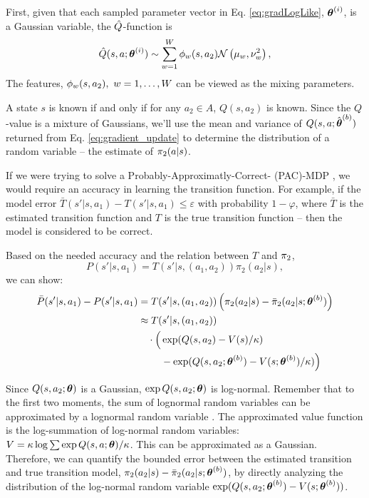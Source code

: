     First, given that each sampled parameter vector in Eq. \ref{eq:gradLogLike}, $\boldsymbol{\mathbb{\theta}}^{(i)}$, is a Gaussian
    variable, the $\hat{Q}$-function is
    \[
        \hat{Q}(s,a ;\boldsymbol{\mathbb{\theta}}^{(i)}) \sim \sum_{w=1}^W \phi_{w}(s,a_2) \mathcal{N}\left(\mu_w, \nu_w^2\right),
    \]
    The features, $\phi_{w}(s,a_2),\ w=1,\ldots, W$ can be viewed as the mixing parameters.

    A state $s$ is known if and only if for any $a_2 \in A$, $Q(s,a_2)$ is known. Since the $Q$-value is a mixture of
    Gaussians, we'll use the mean and variance of $Q(s,a;\hat{\boldsymbol{\mathbb{\theta}}}^{(b)})$ returned from Eq.
    \ref{eq:gradient_update} to determine the distribution of a random variable -- the estimate of $\pi_{2}(a|s)$.

    If we were trying to solve a Probably-Approximatly-Correct- (PAC)-MDP \cite{Fu-RSS-14}, we would require an accuracy
    in learning the transition function. For example, if the model error $\bar T(s'|s,a_1) - T(s'|s,a_1) \le
    \varepsilon$ with probability $1-\varphi$, where $\bar T$ is the estimated transition function and $T$ is the true
    transition function -- then the model is considered to be correct.

    Based on the needed accuracy and the relation between $T$ and $\pi_{2}$,
    \[
        P(s'|s,a_1) = T(s'|s,(a_1,a_2))\pi_2(a_2|s),
    \]
    we can show:
    \begin{align*}
        \bar P(s'|s,a_1)  -P(s'|s,a_1)
        & = T(s'|s,(a_1,a_2))\left( \pi_2(a_2|s) - \bar \pi_2(a_2|s;\boldsymbol{\mathbb{\theta}}^{(b)})
        \right)\\
        & \approx T(s'|s,(a_1,a_2)) \\
        & \quad \cdot \Big(\exp(Q(s,a_2)-V(s)/\kappa) \\
        & \qquad\ - \exp(Q(s,a_2;\boldsymbol{\mathbb{\theta}}^{(b)})-V(s;\boldsymbol{\mathbb{\theta}}^{(b)})/\kappa) \Big)
    \end{align*}

    Since $Q(s,a_2;\boldsymbol{\mathbb{\theta}})$ is a Gaussian, $\exp Q(s,a_2;\boldsymbol{\mathbb{\theta}})$ is log-normal. Remember that to the first two
    moments, the sum of lognormal random variables can be approximated by a lognormal random variable
    \cite{fenton1960sum}.  The approximated value function is the log-summation of log-normal random variables: ${V
    =\kappa \log \sum \exp Q(s,a;\boldsymbol{\mathbb{\theta}})/\kappa}$. This can be approximated as a Gaussian. Therefore, we can quantify
    the bounded error between the estimated transition and true transition model, $\pi_2(a_2|s) - \bar
    \pi_2(a_2|s;\boldsymbol{\mathbb{\theta}}^{(b)})$,  by directly analyzing the distribution of the log-normal random variable
    $\exp(Q(s,a_2;\boldsymbol{\mathbb{\theta}}^{(b)})-V(s;\boldsymbol{\mathbb{\theta}}^{(b)}))$.

